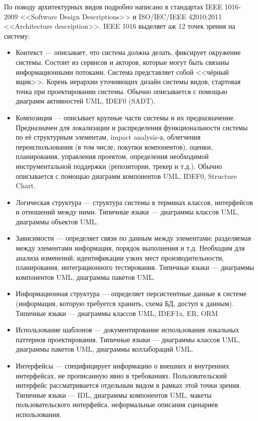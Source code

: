 \documentclass{../../text-style}
\begin{document}
По поводу архитектурных видов подробно написано в стандартах IEEE 1016-2009 <<Software Design Descriptions>> и ISO/IEC/IEEE 42010:2011 <<Architecture description>>. IEEE 1016 выделяет аж 12 точек зрения на систему:
\begin{itemize}
    \item Контекст  --- описывает, что система должна делать, фиксирует окружение системы. Состоит из сервисов и акторов, которые могут быть связаны информационными потоками. Система представляет собой <<чёрный ящик>>. Корень иерархии уточняющих дизайн системы видов, стартовая точка при проектировании системы. Обычно описывается с помощью диаграмм активностей UML, IDEF0 (SADT).
    \item Композиция --- описывает крупные части системы и их предназначение. Предназначен для локализации и распределения функциональности системы по её структурным элементам, impact analysis-а, облегчения переиспользования (в том числе, покупки компонентов), оценки, планирования, управления проектом, определения необходимой инструментальной поддержки (репозитории, трекер и т.д.). Обычно описывается с помощью диаграмм компонентов UML, IDEF0, Structure Chart.
    \item Логическая структура --- структура системы в терминах классов, интерфейсов и отношений между ними. Типичные языки --- диаграммы классов UML, диаграммы объектов UML.
    \item Зависимости ---  определяет связи по данным между элементами: разделяемая между элементами информация, порядок выполнения и т.д. Необходим для анализа изменений, идентификации узких мест производительности, планирования, интеграционного тестирования. Типичные языки --- диаграммы компонентов UML, диаграммы пакетов UML.
    \item Информационная структура --- определяет персистентные данные в системе (информация, которую требуется хранить, схема БД, доступ к данным). Типичные языки --- диаграммы классов UML, IDEF1x, ER, ORM
    \item Использование шаблонов --- документирование использования локальных паттернов проектирования. Типичные языки --- диаграммы классов UML, диаграммы пакетов UML, диаграммы коллабораций UML.
    \item Интерфейсы --- специфицирует информацию о внешних и внутренних интерфейсах, не прописанную явно в требованиях. Пользовательский интерфейс рассматривается отдельным видом в рамках этой точки зрения. Типичные языки --- IDL, диаграммы компонентов UML, макеты пользовательского интерфейса, неформальные описания сценариев использования.

\end{itemize}
\end{document}

